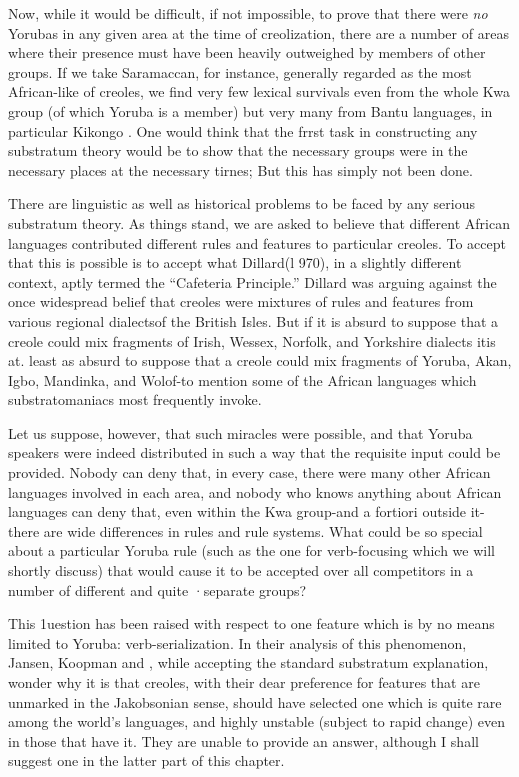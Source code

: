 Now, while it would be difficult, if not impossible, to prove that there were \textit{no} Yorubas in any given area at the time of creolization, there are a number of areas where their presence must have been heavily outweighed by members of other groups. If we take Sara\-maccan, for instance, generally regarded as the most African-like of creoles, we find very few lexical survivals even from the whole Kwa group (of which Yoruba is a member) but very many from Bantu lan\-guages, in particular Kikongo \citep{Daeleman1972}. One would think that the frrst task in constructing any substratum theory would be to show that the necessary groups were in the necessary places at the necessary tirnes; But this has simply not been done.

There are linguistic as well as historical problems to be faced by any serious substratum theory. As things stand, we are asked to believe that different African languages contributed different rules and features to particular creoles. To accept that this is possible is to accept what Dillard(l 970), in a slightly different context, aptly termed the ``Cafe\-teria Principle.'' Dillard was arguing against the once widespread belief
that creoles were mixtures of rules and features from various regional dialectsof the British Isles. But if it is absurd to suppose that a creole could mix fragments of Irish, Wessex, Norfolk, and Yorkshire dialects itis at. least as absurd to suppose that a creole could mix fragments of
Yoruba, Akan, Igbo, Mandinka, and Wolof-to mention some of the African languages which substratomaniacs most frequently invoke.

Let us suppose, however, that such miracles were possible, and that Yoruba speakers were indeed distributed in such a way that the
requisite input could be provided. Nobody can deny that, in every case, there were many other African languages involved in each area, and nobody who knows anything about African languages can deny that, even within the Kwa group-and a fortiori outside it-there are wide differences in rules and rule systems. What could be so special about a particular Yoruba rule (such as the one for verb-focusing which we will shortly discuss) that would cause it to be accepted over all compe\-titors in a number of different and quite ·separate groups?

This 1uestion has been raised with respect to one feature which is by no means limited to Yoruba: verb-serialization. In their analysis of this phenomenon, Jansen, Koopman and \citet{Muysken1978}, while accepting the standard substratum explanation, wonder why it is that creoles, with their dear preference for features that are unmarked in the Jakobsonian sense, should have selected one which is quite rare among the world's languages, and highly unstable (subject to rapid change) even in those that have it. They are unable to provide an answer, although I shall suggest one in the latter part of this chapter.

